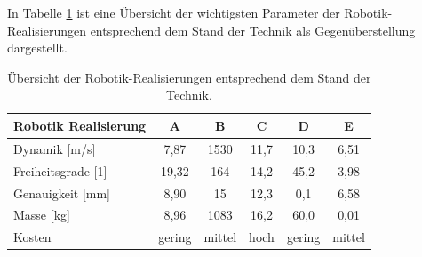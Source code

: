 In Tabelle \ref{tab:Tabelle1} ist eine Übersicht der wichtigsten Parameter der
Robotik-Realisierungen entsprechend dem Stand der Technik als Gegenüberstellung dargestellt.

\begin{table}[H]
    \centering
    \setlength{\arrayrulewidth}{0.1mm}
    \setlength{\tabcolsep}{13pt}
    \renewcommand{\arraystretch}{1.8}
    \begin{tabular}{ |p{4cm}|c|c|c|c|c| }
        \hline
        Robotik Realisierung & A\cite{publikation:publikationtitel1} & B\cite{publikation:publikationtitel2} & C\cite{buch:buchtitel1} & D\cite{zeitschrift:zeitschrifttitel1} & E\cite{web:webseite1} \\
        \hline
        Dynamik [m/s]        & 7,87                                  & 1530                                  & 11,7                    & 10,3                                  & 6,51                  \\
        Freiheitsgrade [1]   & 19,32                                 & 164                                   & 14,2                    & 45,2                                  & 3,98                  \\
        Genauigkeit [mm]     & 8,90                                  & 15                                    & 12,3                    & 0,1                                   & 6,58                  \\
        Masse [kg]           & 8,96                                  & 1083                                  & 16,2                    & 60,0                                  & 0,01                  \\
        Kosten               & gering                                & mittel                                & hoch                    & gering                                & mittel                \\
        \hline
    \end{tabular}
    \caption{Übersicht der Robotik-Realisierungen entsprechend dem Stand der Technik.}
    \label{tab:Tabelle1}
\end{table}